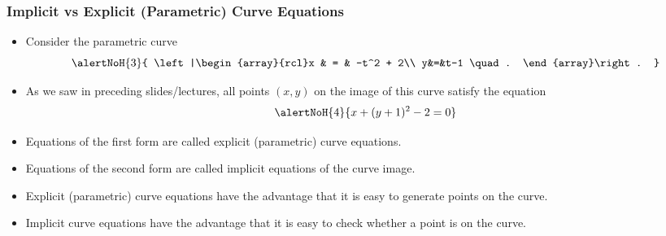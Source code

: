 \begin{frame}
\frametitle{Implicit vs Explicit (Parametric) Curve Equations}
\begin{itemize}
\item Consider the parametric curve 
\[\alertNoH{3}{
\left|\begin{array}{rcl}x  & = & -t^2 + 2\\
y&=&t-1 \quad .
\end{array}\right.
}\]
\item<2-> As we saw in preceding slides/lectures, all points $(x,y)$ on the image of this curve satisfy the equation 
\[ \alertNoH{4}{x+(y+1)^2 -2=0}\]
\item<3-> Equations of the first form are called explicit (parametric) curve equations.
\item<4-> Equations of the second form are called implicit equations of the curve image.
\item<5-> Explicit (parametric) curve equations have the advantage that it is easy to generate points on the curve. 
\item<6-> Implicit curve equations have the advantage that it is easy to check whether a point is on the curve.

\end{itemize}
\end{frame}